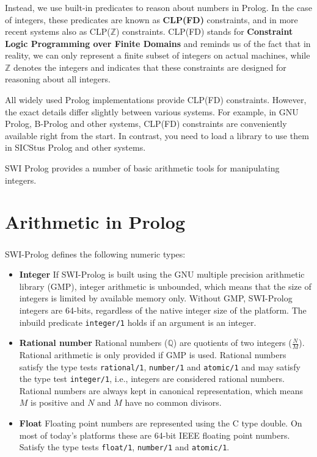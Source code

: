 \begin{frame}
	\frametitle{\insertsection}
	\justifying
	Instead, we use built-in predicates to reason about numbers in Prolog. In the case of integers, these predicates are known as \textbf{CLP(FD)} constraints, and in more recent systems also as CLP(\(\mathds{Z} \)) constraints. CLP(FD) stands for \textbf{Constraint Logic Programming over Finite Domains} and reminds us of the fact that in reality, we can only represent a finite subset of integers on actual machines, while \(\mathds{Z} \) denotes the integers and indicates that these constraints are designed for reasoning about all integers.
	
	All widely used Prolog implementations provide CLP(FD) constraints. However, the exact details differ slightly between various systems. For example, in GNU Prolog, B-Prolog and other systems, CLP(FD) constraints are conveniently available right from the start. In contrast, you need to load a library to use them in SICStus Prolog and other systems.
	
	SWI Prolog provides a number of basic arithmetic tools for manipulating integers.
\end{frame}


\section{Arithmetic in Prolog}

\begin{frame}[shrink=3]
	\frametitle{\insertsection}
	
	SWI-Prolog defines the following numeric types:
	
	\begin{itemize}
		\item \textbf{Integer} If SWI-Prolog is built using the GNU multiple precision arithmetic library (GMP), integer arithmetic is unbounded, which means that the size of integers is limited by available memory only. Without GMP, SWI-Prolog integers are 64-bits, regardless of the native integer size of the platform. The inbuild predicate \texttt{integer/1} holds if
		an argument is an integer.
		\item \textbf{Rational number} Rational numbers (\(\mathds{Q} \)) are quotients of two integers (\(\frac{N}{M} \)). Rational arithmetic is only provided if GMP is used. Rational numbers satisfy the type tests \texttt{rational/1}, \texttt{number/1} and \texttt{atomic/1} and may satisfy the type test \texttt{integer/1}, i.e., integers are considered rational numbers. Rational numbers are always kept in canonical representation, which means \(M\) is positive and \(N\) and \(M\) have no common divisors.
		\item \textbf{Float} Floating point numbers are represented using the C type double. On most of today's platforms these are 64-bit IEEE floating point numbers. Satisfy the type tests \texttt{float/1}, \texttt{number/1} and \texttt{atomic/1}.
	\end{itemize}

\end{frame}


